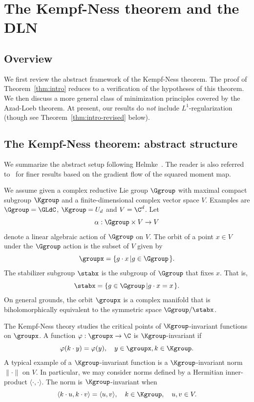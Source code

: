 \section{The Kempf-Ness theorem and the DLN}
\label{sec:kempf-ness}
\subsection{Overview}
We first review the abstract framework of the Kempf-Ness theorem. The proof of Theorem~\ref{thm:intro} reduces to a verification of the hypotheses of this theorem. We then discuss a more general class of minimization principles covered by 
the Azad-Loeb theorem. At present, our results do {\em not\/} include $L^1$-regularization (though see Theorem~\ref{thm:intro-revised} below).


\subsection{The Kempf-Ness theorem: abstract structure}
We summarize the abstract setup  following Helmke~\cite[\S 2]{Helmke}. The reader is also referred to~\cite{Ness} for finer results based on the gradient flow of the squared moment map. 

We assume given a complex reductive Lie group $\Ggroup$ with maximal compact subgroup $\Kgroup$ and a finite-dimensional complex vector space $V$. Examples are $\Ggroup =\GLdC$, $\Kgroup = U_d$ and $V = \C^d$. Let 
\begin{equation}
\label{eq:kn1}
\alpha: \Ggroup \times  V \to V
\end{equation}
denote a linear algebraic action of $\Ggroup$ on $V$. The orbit of a point $x \in V$ under the $\Ggroup$ action is the subset of $V$ given by
\begin{equation}
\label{eq:kn2}
\groupx  = \{g\cdot x \left| g \in \Ggroup\right. \}.    
\end{equation}
The stabilizer subgroup $\stabx$ is the subgroup of $\Ggroup$ that fixes $x$. That is, 
\begin{equation}
\label{eq:kn3}
\stabx  = \{g \in \Ggroup  \left| g\cdot x= x\right. \}.    
\end{equation}
On general grounds, the orbit $\groupx$ is a complex manifold that is biholomorphically equivalent to the symmetric space $\Ggroup/\stabx$. 

The Kempf-Ness theory studies the critical points of $\Kgroup$-invariant functions on $\groupx$. A function $\varphi: \groupx \to \C$ is $\Kgroup$-invariant if 
\[ \varphi(k\cdot y) = \varphi (y), \quad y \in \groupx, k \in \Kgroup.\]
A typical example of a $\Kgroup$-invariant function is a $\Kgroup$-invariant norm $\|\cdot \|$ on $V$. In particular, we may consider norms defined by a Hermitian inner-product $\langle \cdot, \cdot \rangle$. The norm is $\Kgroup$-invariant when 
\[ \langle k\cdot u, k \cdot v \rangle = \langle u, v \rangle, \quad k \in \Kgroup, \quad u,v \in V.\]

